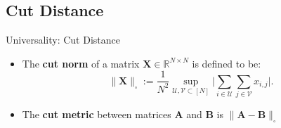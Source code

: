 \documentclass{beamer}
\begin{document}
\subsection{Cut Distance}
\begin{frame}{Universality: Cut Distance}
\begin{itemize}[itemsep=1em, label=\textbullet]



    

  \item The \textbf{cut norm} of a matrix $\mathbf{X}\in\mathbb{R}^{N\times N}$ is defined to be:
    \begin{equation}
  \|\mathbf{X}\|_{\square}:=\frac{1}{N^2}\sup_{\mathcal{U},\mathcal{V}\subset[N]}\Big|\sum_{i\in \mathcal{U}}\sum_{j\in \mathcal{V}}x_{i,j}\Big|.
\end{equation}  

\item The \textbf{cut metric} between matrices $\mathbf{A}$ and $\mathbf{B}$ is $\|\mathbf{A}-\mathbf{B} \|_{\square}$ 


\end{itemize}
    
\end{frame}
\end{document}
